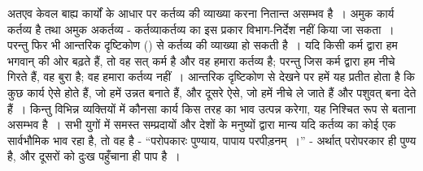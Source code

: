 अतएव केवल बाह्य कार्यों के आधार पर कर्तव्य की व्याख्या करना नितान्त असम्भव है~। अमुक कार्य कर्तव्य है तथा अमुक अकर्तव्य - कर्तव्याकर्तव्य का इस प्रकार विभाग-निर्देश नहीं किया जा सकता~। परन्तु फिर भी आन्तरिक दृष्टिकोण () से कर्तव्य की व्याख्या हो सकती है~। यदि किसी कर्म द्वारा हम भगवान् की ओर बढ़ते हैं, तो वह सत् कर्म है और वह हमारा कर्तव्य है; परन्तु जिस कर्म द्वारा हम नीचे गिरते हैं, वह बुरा है; वह हमारा कर्तव्य नहीं~। आन्तरिक दृष्टिकोण से देखने पर हमें यह प्रतीत होता है कि कुछ कार्य ऐसे होते हैं, जो हमें उन्नत बनाते हैं, और दूसरे ऐसे, जो हमें नीचे ले जाते हैं और पशुवत् बना देते हैं~। किन्तु विभिन्न व्यक्तियों में कौनसा कार्य किस तरह का भाव उत्पन्न करेगा, यह निश्चित रूप से बताना असम्भव है~। सभी युगों में समस्त सम्प्रदायों और देशों के मनुष्यों द्वारा मान्य यदि कर्तव्य का कोई एक सार्वभौमिक भाव रहा है, तो वह है - “परोपकारः पुण्याय, पापाय परपीड़नम्~।” - अर्थात् परोपरकार ही पुण्य है, और दूसरों को दुःख पहुँचाना ही पाप है~।

